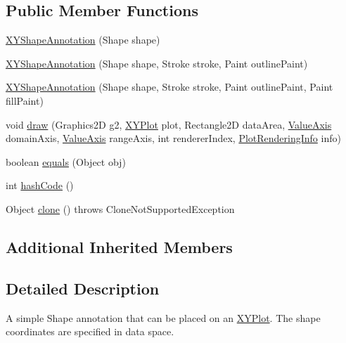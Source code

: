 \subsection*{Public Member Functions}
\begin{DoxyCompactItemize}
\item 
\mbox{\hyperlink{classorg_1_1jfree_1_1chart_1_1annotations_1_1_x_y_shape_annotation_a0b258efde226016677e747e77764ab44}{X\+Y\+Shape\+Annotation}} (Shape shape)
\item 
\mbox{\hyperlink{classorg_1_1jfree_1_1chart_1_1annotations_1_1_x_y_shape_annotation_aaca92d8e51e0ef5ac77890bc84c68651}{X\+Y\+Shape\+Annotation}} (Shape shape, Stroke stroke, Paint outline\+Paint)
\item 
\mbox{\hyperlink{classorg_1_1jfree_1_1chart_1_1annotations_1_1_x_y_shape_annotation_a69784b8eb72ea02114309ad2c00c8edb}{X\+Y\+Shape\+Annotation}} (Shape shape, Stroke stroke, Paint outline\+Paint, Paint fill\+Paint)
\item 
void \mbox{\hyperlink{classorg_1_1jfree_1_1chart_1_1annotations_1_1_x_y_shape_annotation_a64d3ef75c67e6911e2490329c550c5db}{draw}} (Graphics2D g2, \mbox{\hyperlink{classorg_1_1jfree_1_1chart_1_1plot_1_1_x_y_plot}{X\+Y\+Plot}} plot, Rectangle2D data\+Area, \mbox{\hyperlink{classorg_1_1jfree_1_1chart_1_1axis_1_1_value_axis}{Value\+Axis}} domain\+Axis, \mbox{\hyperlink{classorg_1_1jfree_1_1chart_1_1axis_1_1_value_axis}{Value\+Axis}} range\+Axis, int renderer\+Index, \mbox{\hyperlink{classorg_1_1jfree_1_1chart_1_1plot_1_1_plot_rendering_info}{Plot\+Rendering\+Info}} info)
\item 
boolean \mbox{\hyperlink{classorg_1_1jfree_1_1chart_1_1annotations_1_1_x_y_shape_annotation_ad53de94e0f78e768913884058895c803}{equals}} (Object obj)
\item 
int \mbox{\hyperlink{classorg_1_1jfree_1_1chart_1_1annotations_1_1_x_y_shape_annotation_a791a110d88d4fb24f19839d6dd482f38}{hash\+Code}} ()
\item 
Object \mbox{\hyperlink{classorg_1_1jfree_1_1chart_1_1annotations_1_1_x_y_shape_annotation_a1e1b55b12219a54f5f0fc0099be1311e}{clone}} ()  throws Clone\+Not\+Supported\+Exception 
\end{DoxyCompactItemize}
\subsection*{Additional Inherited Members}


\subsection{Detailed Description}
A simple {\ttfamily Shape} annotation that can be placed on an \mbox{\hyperlink{}{X\+Y\+Plot}}. The shape coordinates are specified in data space. 

